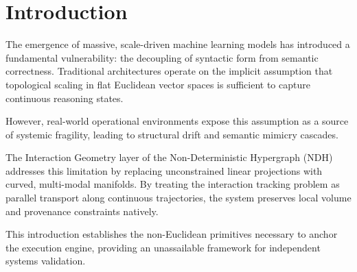 \section{Introduction}
\label{sec:geometry-introduction}

The emergence of massive, scale-driven
machine learning models has introduced
a fundamental vulnerability: the
decoupling of syntactic form from
semantic correctness. Traditional
architectures operate on the implicit
assumption that topological scaling
in flat Euclidean vector spaces
is sufficient to capture continuous
reasoning states. 

However, real-world operational environments
expose this assumption as a source of
systemic fragility, leading to structural
drift and semantic mimicry cascades.

The Interaction Geometry layer of the
Non-Deterministic Hypergraph (NDH)
addresses this limitation by replacing
unconstrained linear projections with
curved, multi-modal manifolds. By treating
the interaction tracking problem as parallel
transport along continuous trajectories,
the system preserves local volume and
provenance constraints natively. 

This introduction establishes the non-Euclidean
primitives necessary to anchor the execution
engine, providing an unassailable framework
for independent systems validation.
